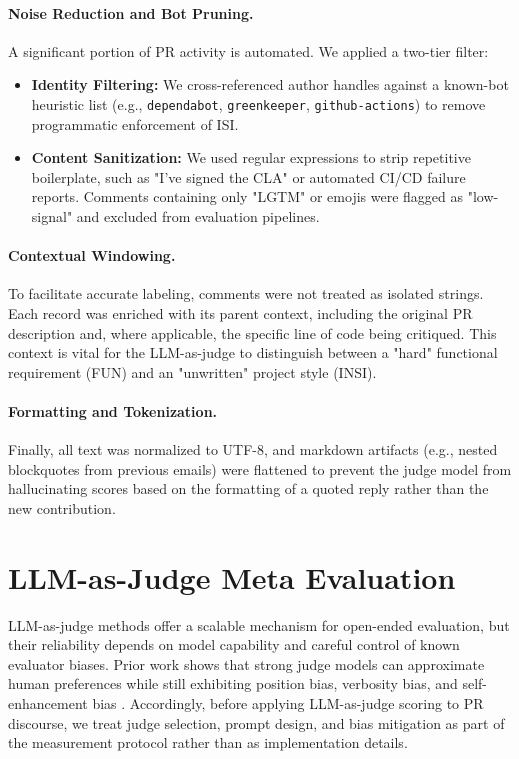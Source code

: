 \documentclass[10pt]{article}
\begin{document}
\paragraph{Noise Reduction and Bot Pruning.} A significant portion of PR activity is automated. We applied a two-tier filter:
\begin{itemize}
\item \textbf{Identity Filtering:} We cross-referenced author handles against a known-bot heuristic list (e.g., \texttt{dependabot}, \texttt{greenkeeper}, \texttt{github-actions}) to remove programmatic enforcement of ISI.
\item \textbf{Content Sanitization:} We used regular expressions to strip repetitive boilerplate, such as "I've signed the CLA" or automated CI/CD failure reports. Comments containing only "LGTM" or emojis were flagged as "low-signal" and excluded from evaluation pipelines.
\end{itemize}

\paragraph{Contextual Windowing.} To facilitate accurate labeling, comments were not treated as isolated strings. Each record was enriched with its parent context, including the original PR description and, where applicable, the specific line of code being critiqued. This context is vital for the LLM-as-judge to distinguish between a "hard" functional requirement (FUN) and an "unwritten" project style (INSI).

\paragraph{Formatting and Tokenization.} Finally, all text was normalized to UTF-8, and markdown artifacts (e.g., nested blockquotes from previous emails) were flattened to prevent the judge model from hallucinating scores based on the formatting of a quoted reply rather than the new contribution.


\section{LLM-as-Judge Meta Evaluation}
LLM-as-judge methods offer a scalable mechanism for open-ended evaluation, but their reliability depends on model capability and careful control of known evaluator biases. Prior work shows that strong judge models can approximate human preferences while still exhibiting position bias, verbosity bias, and self-enhancement bias \cite{zheng2023judging}. Accordingly, before applying LLM-as-judge scoring to PR discourse, we treat judge selection, prompt design, and bias mitigation as part of the measurement protocol rather than as implementation details.
\end{document}
